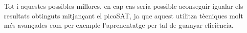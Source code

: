 Tot i aquestes possibles millores, en cap cas seria possible aconseguir igualar els resultats obtinguts mitjançant el picoSAT, ja que aquest utilitza tècniques molt més avançades com per exemple l'aprenentatge per tal de guanyar eficiència.


\nocite{*}




